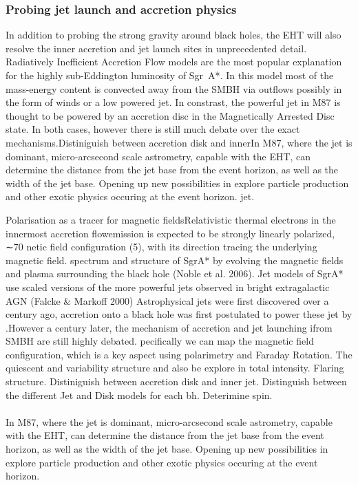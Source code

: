\subsubsection{Probing jet launch and accretion physics}

In addition to probing the strong gravity around black holes, the EHT will also resolve the inner accretion and jet launch sites in unprecedented detail. Radiatively Inefficient Accretion Flow \citep[(RIAF),][]{Yuan_2003} models are the most popular explanation for the highly sub-Eddington luminosity of Sgr~A*. In this model most of the mass-energy content is convected away from the SMBH via outflows possibly in the form of winds or a low powered jet. In constrast, the powerful jet in M87 is thought to be powered by an accretion disc in the Magnetically Arrested Disc \citep[(MAD),][]{Narayan_2003} state. In both cases, however there is still much debate over the exact mechanisms.Distiniguish between accretion disk and innerIn M87, where the jet is dominant, micro-arcsecond scale astrometry, capable with the EHT, can determine the distance from the jet base from the event horizon, as well as the width of the jet base. Opening up new possibilities in explore particle production and other exotic physics occuring at the event horizon.  jet. 

Polarisation as a tracer for magnetic fieldsRelativistic thermal electrons in the innermost accretion flowemission is expected
to be strongly linearly polarized, ∼70%
netic field configuration (5), with its direction tracing the underlying magnetic field.
spectrum and structure of SgrA* by evolving the magnetic fields and plasma surrounding the
black hole (Noble et al. 2006). Jet models of SgrA* use scaled versions of the more powerful
jets observed in bright extragalactic AGN (Falcke & Markoff 2000)
Astrophysical jets were first discovered over a century ago, accretion onto a black hole was first postulated to power these jet by .However a century later, the mechanism of accretion and jet launching ifrom SMBH are still highly debated. 
pecifically we can map the magnetic field configuration, which is a key aspect using polarimetry and Faraday Rotation. The quiescent and variability structure and also be explore in total intensity. Flaring structure.  Distiniguish between accretion disk and inner jet. Distinguish between the different Jet and Disk models for each bh. Deterimine spin.\\
~\\
In M87, where the jet is dominant, micro-arcsecond scale astrometry, capable with the EHT, can determine the distance from the jet base from the event horizon, as well as the width of the jet base. Opening up new possibilities in explore particle production and other exotic physics occuring at the event horizon. 

